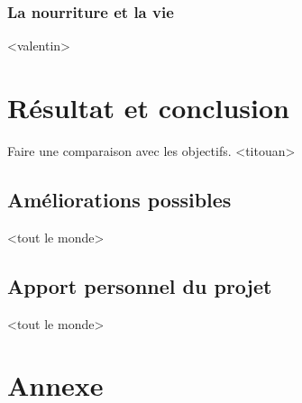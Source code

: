 \documentclass[11pt]{report}
\begin{document}
		\subsection{La nourriture et la vie}
		
		<valentin>

\chapter{Résultat et conclusion}

	Faire une comparaison avec les objectifs. <titouan>
	
	\section{Améliorations possibles}
	
	<tout le monde>
	
	\section{Apport personnel du projet}
	
	<tout le monde>

\chapter{Annexe}
\end{document}
